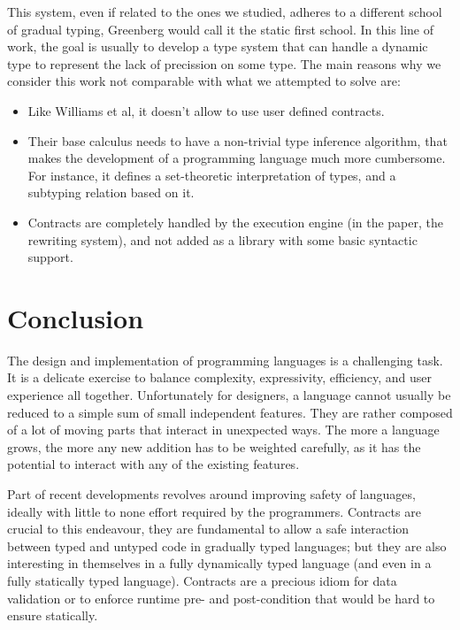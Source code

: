 \documentclass[sigplan,10pt,review,anonymous]{acmart}
\begin{document}
This system, even if related to the ones we studied, adheres to a different
school of gradual typing, Greenberg would call it the static first
school\cite{practiceTheoryGrad}.
In this line of work, the goal is usually to develop a type system that can
handle a dynamic type to represent the lack of precission on some type.
The main reasons why we consider this work not comparable with what we attempted
to solve are:
\begin{itemize}
  \item Like Williams et al\cite{RootCauseOfBlame}, it doesn't allow
        to use user defined contracts.
  \item Their base calculus needs to have a non-trivial type inference
        algorithm, that makes the development of a programming language
        much more cumbersome. For instance, it defines a set-theoretic
        interpretation of types, and a subtyping relation based on it.
  \item Contracts are completely handled by the execution engine (in the paper,
        the rewriting system), and not added as a library with some basic
        syntactic support.
\end{itemize}



\section{Conclusion}
\label{sec:conclusion}

The design and implementation of programming languages is a challenging task. It
is a delicate exercise to balance complexity, expressivity, efficiency, and
user experience all together. Unfortunately for designers, a language cannot
usually be reduced to a simple sum of small independent features. They are
rather composed of a lot of moving parts that interact in unexpected ways. The
more a language grows, the more any new addition has to be weighted carefully,
as it has the potential to interact with any of the existing features.

Part of recent developments revolves around improving safety of
languages, ideally with little to none effort required by the programmers.
Contracts are crucial to this endeavour, they are fundamental to
allow a safe interaction between typed and untyped code in gradually typed languages;
but they are also interesting in themselves in a fully dynamically typed
language (and even in a fully statically typed language). Contracts are a
precious idiom for data validation or to enforce runtime pre- and post-condition that
would be hard to ensure statically.
\end{document}
